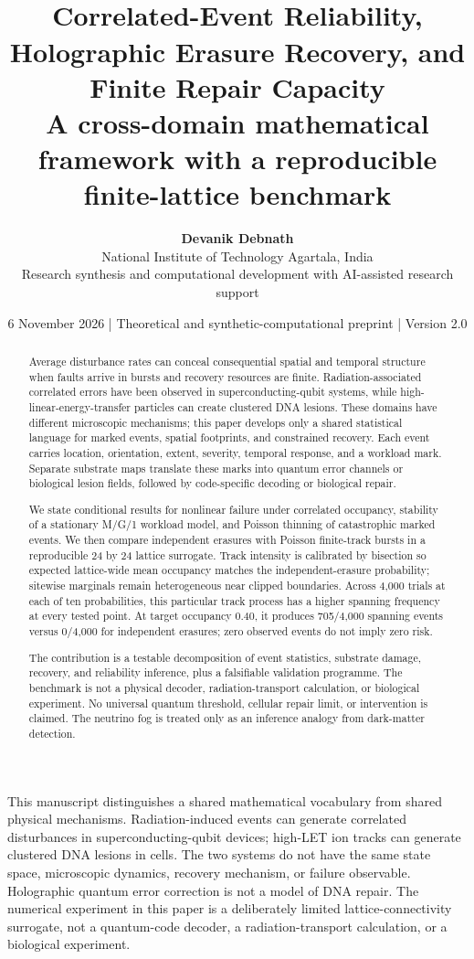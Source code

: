 \documentclass[11pt,a4paper,oneside]{article}
\title{\vspace{-1.0em}{\LARGE\bfseries\color{ink} Burst-Robust Codes for Life and Qubits}\\[.45em]{\Large Correlated-Event Reliability, Holographic Erasure Recovery, and Finite Repair Capacity}\\[.5em]{\normalsize A cross-domain mathematical framework with a reproducible finite-lattice benchmark}}
\author{\textbf{Devanik Debnath}\\National Institute of Technology Agartala, India\\[.3em]\small Research synthesis and computational development with AI-assisted research support}
\date{\small 6 November 2026 \quad | \quad Theoretical and synthetic-computational preprint \quad | \quad Version 2.0}
\newenvironment{scopebox}{\begin{tcolorbox}[colback=coral!6,colframe=coral!75!black,boxrule=.8pt,arc=2mm,title=Scope boundary]}{\end{tcolorbox}}
\begin{document}
\maketitle
\thispagestyle{empty}
\begin{scopebox}
This manuscript distinguishes a shared mathematical vocabulary from shared physical mechanisms. Radiation-induced events can generate correlated disturbances in superconducting-qubit devices; high-LET ion tracks can generate clustered DNA lesions in cells. The two systems do not have the same state space, microscopic dynamics, recovery mechanism, or failure observable. Holographic quantum error correction is not a model of DNA repair. The numerical experiment in this paper is a deliberately limited lattice-connectivity surrogate, not a quantum-code decoder, a radiation-transport calculation, or a biological experiment.
\end{scopebox}
\begin{abstract}
Average disturbance rates can conceal consequential spatial and temporal structure when faults arrive in bursts and recovery resources are finite. Radiation-associated correlated errors have been observed in superconducting-qubit systems, while high-linear-energy-transfer particles can create clustered DNA lesions. These domains have different microscopic mechanisms; this paper develops only a shared statistical language for marked events, spatial footprints, and constrained recovery. Each event carries location, orientation, extent, severity, temporal response, and a workload mark. Separate substrate maps translate these marks into quantum error channels or biological lesion fields, followed by code-specific decoding or biological repair.

We state conditional results for nonlinear failure under correlated occupancy, stability of a stationary M/G/1 workload model, and Poisson thinning of catastrophic marked events. We then compare independent erasures with Poisson finite-track bursts in a reproducible 24 by 24 lattice surrogate. Track intensity is calibrated by bisection so expected lattice-wide mean occupancy matches the independent-erasure probability; sitewise marginals remain heterogeneous near clipped boundaries. Across 4,000 trials at each of ten probabilities, this particular track process has a higher spanning frequency at every tested point. At target occupancy 0.40, it produces 705/4,000 spanning events versus 0/4,000 for independent erasures; zero observed events do not imply zero risk.

The contribution is a testable decomposition of event statistics, substrate damage, recovery, and reliability inference, plus a falsifiable validation programme. The benchmark is not a physical decoder, radiation-transport calculation, or biological experiment. No universal quantum threshold, cellular repair limit, or intervention is claimed. The neutrino fog is treated only as an inference analogy from dark-matter detection.
\end{abstract}
\newpage
\setcounter{tocdepth}{1}
\tableofcontents
\newpage
\end{document}
